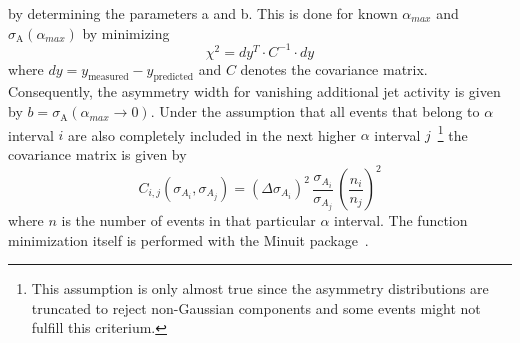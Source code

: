 by determining the parameters a and b. This is done for known $\alpha_{max}$ and $\sigma_\mathrm{A}(\alpha_{max})$ by minimizing 
\begin{equation}
\chi^2 = dy^T \cdot C^{-1} \cdot dy
\end{equation}
where $dy = y_{\mathrm{measured}} - y_{\mathrm{predicted}}$ and $C$ denotes the covariance matrix. Consequently, the asymmetry width for vanishing additional jet activity is given by $b=\sigma_\mathrm{A}(\alpha_{max} \rightarrow 0)$. Under the assumption that all events that belong to $\alpha$ interval $i$ are also completely included in the next higher $\alpha$ interval $j$~\footnote{This assumption is only almost true since the asymmetry distributions are truncated to reject non-Gaussian components and some events might not fulfill this criterium.} the covariance matrix is given by
\begin{equation}
C_{i,j}(\sigma_{A_i},\sigma_{A_j}) = (\Delta \sigma_{A_i})^2 \, \frac{\sigma_{A_i}}{\sigma_{A_j}} \, (\frac{n_i}{n_j})^2 
\end{equation}
where $n$ is the number of events in that particular $\alpha$ interval. The function minimization itself is performed with the Minuit package~\cite{Minuit}. 

